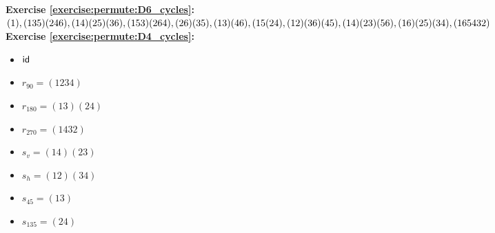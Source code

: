 \noindent\textbf{Exercise \ref{exercise:permute:D6_cycles}:}\\ %
$(1), (135)(246), (14)(25)(36), (153)(264), (26)(35), (13)(46), \\(15(24), (12)(36)(45), (14)(23)(56), (16)(25)(34), (165432)$\\

\noindent\textbf{Exercise \ref{exercise:permute:D4_cycles}:}
\begin{multicols}{3}
\begin{itemize}
\item
$\sf{id}$

\item
$r_{90} = (1234)$

\item
$r_{180} = (13)(24)$

\item
$r_{270} = (1432)$

\item
$s_v = (14)(23)$

\item
$s_h = (12)(34)$

\item
$s_{45} = (13)$

\item
$s_{135} = (24)$
\end{itemize}
\end{multicols}

